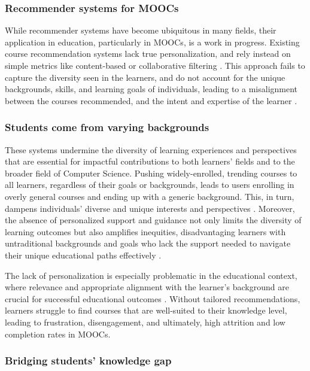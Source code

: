 \subsubsection{Recommender systems for MOOCs} 

While recommender systems have become ubiquitous in many fields, their application in education, particularly in MOOCs, is a work in progress. Existing course recommendation systems lack true personalization, and rely instead on simple metrics like content-based or collaborative filtering \cite{da_silva_systematic_2023} \cite{khalid_recommender_2020}. This approach fails to capture the diversity seen in the learners, and do not account for the unique backgrounds, skills, and learning goals of individuals, leading to a misalignment between the courses recommended, and the intent and expertise of the learner \cite{noauthor_reinforced_nodate}.

\subsubsection{Students come from varying backgrounds}

These systems undermine the diversity of learning experiences and perspectives that are essential for impactful contributions to both learners' fields and to the broader field of Computer Science. Pushing widely-enrolled, trending courses to all learners, regardless of their goals or backgrounds, leads to users enrolling in overly general courses and ending up with a generic background. This, in turn, dampens individuals’ diverse and unique interests and perspectives \cite{noauthor_2022_nodate}. Moreover, the absence of personalized support and guidance not only limits the diversity of learning outcomes but also amplifies inequities, disadvantaging learners with untraditional backgrounds and goals who lack the support needed to navigate their unique educational paths effectively \cite{dumont_promise_2023}.

The lack of personalization is especially problematic in the educational context, where relevance and appropriate alignment with the learner's background are crucial for successful educational outcomes \cite{noauthor_building_2017}. Without tailored recommendations, learners struggle to find courses that are well-suited to their knowledge level, leading to frustration, disengagement, and ultimately, high attrition and low completion rates in MOOCs.

\subsubsection{Bridging students' knowledge gap}

